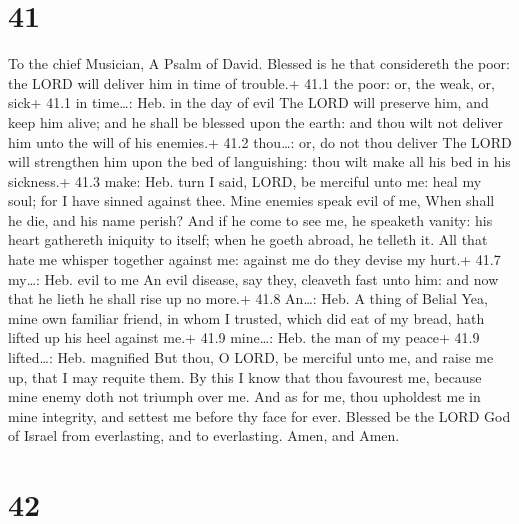 \hypertarget{section-40}{%
\section{41}\label{section-40}}

To the chief Musician, A Psalm of David.  Blessed is he that
considereth the poor: the LORD will deliver him in time of trouble.+
41.1 the poor: or, the weak, or, sick+ 41.1 in time\ldots: Heb. in the
day of evil  The LORD will preserve him, and keep him alive;
and he shall be blessed upon the earth: and thou wilt not deliver him
unto the will of his enemies.+ 41.2 thou\ldots: or, do not thou deliver
 The LORD will strengthen him upon the bed of languishing:
thou wilt make all his bed in his sickness.+ 41.3 make: Heb. turn
 I said, LORD, be merciful unto me: heal my soul; for I have
sinned against thee.  Mine enemies speak evil of me, When
shall he die, and his name perish?  And if he come to see
me, he speaketh vanity: his heart gathereth iniquity to itself; when he
goeth abroad, he telleth it.  All that hate me whisper
together against me: against me do they devise my hurt.+ 41.7 my\ldots:
Heb. evil to me  An evil disease, say they, cleaveth fast
unto him: and now that he lieth he shall rise up no more.+ 41.8
An\ldots: Heb. A thing of Belial  Yea, mine own familiar
friend, in whom I trusted, which did eat of my bread, hath lifted up his
heel against me.+ 41.9 mine\ldots: Heb. the man of my peace+ 41.9
lifted\ldots: Heb. magnified  But thou, O LORD, be merciful
unto me, and raise me up, that I may requite them.  By this
I know that thou favourest me, because mine enemy doth not triumph over
me.  And as for me, thou upholdest me in mine integrity,
and settest me before thy face for ever.  Blessed be the
LORD God of Israel from everlasting, and to everlasting. Amen, and Amen.

\hypertarget{section-41}{%
\section{42}\label{section-41}}

